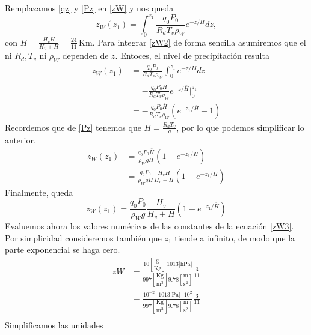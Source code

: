 \documentclass[class=article, crop=false]{standalone}
\begin{document}
Remplazamos \eqref{qz} y \eqref{Pz} en \eqref{zW} y nos queda
\begin{equation}
    z_W(z_1) = \int_0^{z_1} \frac{q_0 P_0}{R_d T_v \rho_W} e^{-z/\bar{H}} dz \label{zW2}
,\end{equation}
con $\bar{H} = \frac{H_v H}{H_v + H} = \frac{24}{11}\,$Km. Para integrar \eqref{zW2} de forma sencilla asumiremos que el ni $R_d, T_v$ ni $\rho_W$ dependen de $z$. Entoces, el nivel de precipitación resulta
\begin{align*}
    z_W(z_1) &= \frac{q_0 P_0}{R_d T_v \rho_W} \int_0^{z_1}  e^{-z/\bar{H}} dz \label{zW2}\\
        &= - \frac{q_0 P_0\bar{H}}{R_d T_v \rho_W}  e^{-z/\bar{H}}\Bigg|_{0}^{z_1}\\
        &= - \frac{q_0 P_0\bar{H}}{R_d T_v \rho_W}(e^{-z_1/\bar{H}} - 1)
\end{align*}
Recordemos que de \eqref{Pz} tenemos que $H = \frac{R_d T_v}{g}$, por lo que podemos simplificar lo anterior.
\begin{align*}
    z_W(z_1) &= \frac{q_0 P_0 \bar{H}}{\rho_W g H} (1 - e^{-z_1/\bar{H}})\\
             &= \frac{q_0 P_0}{\rho_W g H} \frac{H_v H}{H_v + H} (1 - e^{-z_1/\bar{H}})
\end{align*}
Finalmente, queda
\begin{equation}
z_W(z_1) = \frac{q_0 P_0}{\rho_W g} \frac{H_v}{H_v + H} (1- e^{-z_1/\bar{H}}) \label{zW3}
\end{equation}
Evaluemos ahora los valores numéricos de las constantes de la ecuación \eqref{zW3}. Por simplicidad consideremos también que $z_1$ tiende a infinito, de modo que la parte exponencial se haga cero.
\begin{align*}
    zW &= \frac{10\left[\dfrac{\text{g}}{\text{Kg}}\right]\,1013\big[\text{hPa}\big]}{997\left[\dfrac{\text{Kg}}{\text{m}^3}\right] 9.78\left[\dfrac{\text{m}}{\text{s}^2}\right]} \frac{3}{11}\\
       &= \frac{10^{-2} \cdot 1013\big[\text{Pa}\big]\cdot 10^2}{997\left[\dfrac{\text{Kg}}{\text{m}^3}\right] 9.78\left[\dfrac{\text{m}}{\text{s}^2}\right]} \frac{3}{11}\\
\end{align*}
Simplificamos las unidades
\end{document}
